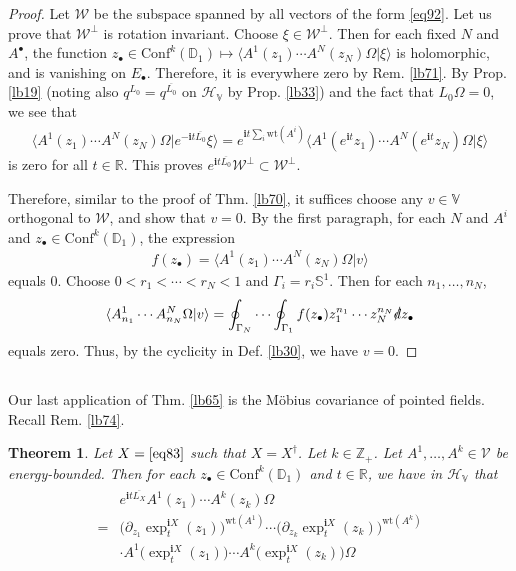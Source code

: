\documentclass[12pt,b5paper,notitlepage]{article}
\theoremstyle{definition}
\theoremstyle{plain}
\newtheorem{thm}[df]{Theorem}
\newcommand{\mc}{\mathcal}
\newcommand{\ovl}{\overline}
\newcommand{\Conf}{\mathrm{Conf}}
\newcommand{\bk}[1]{\langle {#1}\rangle}
\newcommand{\im}{\mathbf{i}}
\newcommand{\blt}{\bullet}
\newcommand{\Vbb}{\mathbb V}
\newcommand{\Zbb}{\mathbb Z}
\newcommand{\Rbb}{\mathbb R}
\newcommand{\Dbb}{\mathbb D}
\newcommand{\wt}{\mathrm{wt}}
\newcommand{\Sbb}{{\mathbb S}}
\newcommand{\HV}{\mathcal H_{\mathbb V}}
\newcommand{\ointn}{\oint\nolimits}
\newcommand{\sd}{\slashed{d}}
\numberwithin{equation}{section}
\begin{document}
\begin{proof}
Let $\mc W$ be the subspace spanned by all vectors of the form \eqref{eq92}. Let us prove that $\mc W^\perp$ is rotation invariant. Choose $\xi\in\mc W^\perp$. Then for each fixed $N$ and $A^\blt$, the function $z_\blt\in \Conf^k(\Dbb_1)\mapsto \bk{A^1(z_1)\cdots A^N(z_N)\Omega|\xi}$ is holomorphic, and is vanishing on $E_\blt$. Therefore, it is everywhere zero by Rem. \ref{lb71}. By Prop. \ref{lb19} (noting also $q^{L_0}=q^{\ovl{L_0}}$ on $\HV$ by Prop. \ref{lb33}) and the fact that $L_0\Omega=0$, we see that
\begin{align*}
\bk{A^1(z_1)\cdots A^N(z_N)\Omega|e^{-\im t\ovl{L_0}}\xi}=e^{\im t\sum_i\wt(A^i)}\bk{A^1(e^{\im t}z_1)\cdots A^N(e^{\im t}z_N)\Omega|\xi}
\end{align*}
is zero for all $t\in\Rbb$. This proves $e^{\im t\ovl{L_0}}\mc W^\perp\subset\mc W^\perp$.

Therefore, similar to the proof of Thm. \ref{lb70}, it suffices choose any $v\in\Vbb$ orthogonal to $\mc W$, and show that $v=0$. By the first paragraph, for each $N$ and $A^i$ and $z_\blt\in\Conf^k(\Dbb_1)$, the expression
\begin{align*}
f(z_\blt)=\bk{A^1(z_1)\cdots A^N(z_N)\Omega|v}
\end{align*}
equals $0$. Choose $0<r_1<\cdots<r_N<1$ and $\Gamma_i=r_i\Sbb^1$. Then for each $n_1,\dots,n_N$,
\begin{align*}
\bk{A^1_{n_1}\cdots A^N_{n_N}\Omega|v}=\ointn_{\Gamma_N}\cdots\ointn_{\Gamma_1}f(z_\blt)z_1^{n_1}\cdots z_N^{n_N}\sd z_\blt
\end{align*}
equals zero. Thus, by the cyclicity in Def. \ref{lb30}, we have $v=0$.
\end{proof}


\subsection{}

Our last application of Thm. \ref{lb65} is the M\"obius covariance of pointed fields. Recall Rem. \ref{lb74}. 




\begin{thm}
Let $X=\eqref{eq83}$ such that $X=X^\dagger$. Let $k\in\Zbb_+$. Let $A^1,\dots,A^k\in\mc V$ be energy-bounded. Then for each  $z_\blt\in\Conf^k(\Dbb_1)$ and $t\in\Rbb$, we have in $\HV$ that
\begin{align}\label{eq94}
\begin{aligned}
&e^{\im t\ovl{L_X}}A^1(z_1)\cdots A^k(z_k)\Omega\\
=&\big(\partial_{z_1}\exp^{\im X}_t(z_1)\big)^{\wt(A^1)}\cdots \big(\partial_{z_k}\exp^{\im X}_t(z_k)\big)^{\wt(A^k)}\\
&\cdot A^1\big(\exp^{\im X}_t(z_1)\big)\cdots A^k\big(\exp^{\im X}_t(z_k)\big)\Omega
\end{aligned}
\end{align}
\end{thm}
\end{document}
